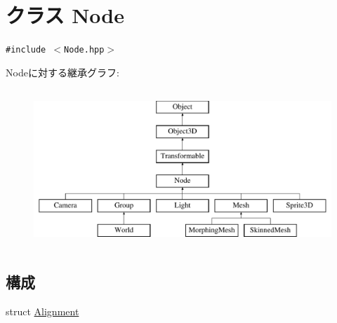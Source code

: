 \hypertarget{classm3g_1_1Node}{
\section{クラス Node}
\label{classm3g_1_1Node}
}
{\tt \#include $<$Node.hpp$>$}

Nodeに対する継承グラフ:\begin{figure}[H]
\begin{center}
\leavevmode
\includegraphics[height=6cm]{classm3g_1_1Node}
\end{center}
\end{figure}
\subsection*{構成}
\begin{CompactItemize}
\item 
struct \hyperlink{structm3g_1_1Node_1_1Alignment}{Alignment}
\end{CompactItemize}
